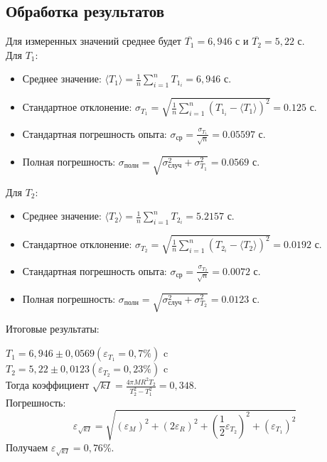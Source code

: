 \documentclass[a4paper]{article}
\begin{document}
\subsection{Обработка результатов}

Для измеренных значений среднее будет $\overline{T_{1}} = 6,946 $ с и $\overline{T_{2}} = 5,22 $ с.\\
Для $T_{1}$:
\begin{itemize}
\item Среднее значение: $\langle T_{1} \rangle = \frac{1}{n}\sum\limits_{i=1}^n T_{1_i} = 6,946$ с. 
\item Стандартное отклонение: $\sigma_{T_{1}} = \sqrt{\frac{1}{n}\sum\limits_{i=1}^n(T_{1_i} - \langle T_{1} \rangle)^2} =  0.125$ с.
\item Стандартная погрешность опыта: $\sigma_\text{ср} = \frac{\sigma_{T_{1}}}{\sqrt{n}} =  0.05597$ с.
\item Полная погрешность: $\sigma_{\text{полн}} = \sqrt{\sigma_{\text{случ}}^2 + \sigma_{T_{1}}^2} = 0.0569$ с.
\end{itemize}
Для $T_{2}$:
\begin{itemize}
\item Среднее значение: $\langle T_{2} \rangle = \frac{1}{n}\sum\limits_{i=1}^n T_{2_i} = 5.2157$ с. 
\item Стандартное отклонение: $\sigma_{T_{2}} = \sqrt{\frac{1}{n}\sum\limits_{i=1}^n(T_{2_i} - \langle T_{2} \rangle)^2} = 0.0192$ с.
\item Стандартная погрешность опыта: $\sigma_\text{ср} = \frac{\sigma_{T_{2}}}{\sqrt{n}} =  0.0072$ с.
\item Полная погрешность: $\sigma_{\text{полн}} = \sqrt{\sigma_{\text{случ}}^2 + \sigma_{T_{2}}^2} = 0.0123$ с.
\end{itemize}
Итоговые результаты: \par

$T_{1} = 6,946 \pm 0,0569  (\varepsilon_{T_{1}} = 0,7\%)$ c\\
$T_{2} = 5,22 \pm 0,0123 (\varepsilon_{T_{2}} = 0,23\%)$ c\\

Тогда коэффициент $\sqrt{kI} = \frac{4 \pi M R^2 T_2}{T_2^2 - T_1^2} = 0,348$.\\

Погрешность:
\[
    \varepsilon_{\sqrt{kI}} = \sqrt{\left(\varepsilon_{M}\right)^2 + \left(2\varepsilon_{R}\right)^2 + \left(\frac{1}{2}\varepsilon_{T_{2}}\right)^2 + \left(\varepsilon_{T_{1}}\right)^2}
\]
Получаем $\varepsilon_{\sqrt{kI}} = 0,76\%$. 
\end{document}
